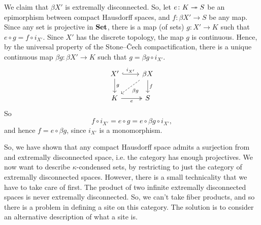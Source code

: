 \documentclass{article}
\begin{document}
We claim that $\beta X'$ is extremally disconnected.
So, let $e \colon K \twoheadrightarrow S$ be an epimorphism between compact Hausdorff spaces,
and $f\colon \beta X' \to S$ be any map.
Since any set is projective in $\operatorname{\mathbf{Set}}$, there is a map (of sets)
$g \colon X' \to K$ such that $e\circ g = f \circ i_{X'}$.
Since $X'$ has the discrete topology, the map $g$ is continuous.
Hence, by the universal property of the Stone--\v{C}ech compactification,
there is a unique continuous map $\beta g \colon \beta X' \to K$ such that
$g = \beta g \circ i_{X'}$.
\begin{equation*}
    \begin{tikzcd}
        X' \rar[hook, "i_{X'}"] \dar["g"] & \beta X \dar["f"] \ar[ld, dashed, "\beta g"] \\
        K \rar[two heads, "e"'] & S
    \end{tikzcd}
\end{equation*}
So
\begin{equation*}
    f \circ i_{X'} = e \circ g = e \circ \beta g \circ i_{X'},
\end{equation*}
and hence $f = e \circ \beta g$, since $i_{X'}$ is a monomorphism.

So, we have shown that any compact Hausdorff space admits a surjection from
and extremally disconnected space, i.e. the category has enough projectives.
We now want to describe $\kappa$-condensed sets, by restricting to
just the category of extremally disconnected spaces. However, there is a small
technicality that we have to take care of first. The product of two
infinite extremally disconnected spaces is never extremally disconnected. So,
we can't take fiber products, and so there is a problem in defining a site
on this category. The solution is to consider an alternative description
of what a site is.
\end{document}

